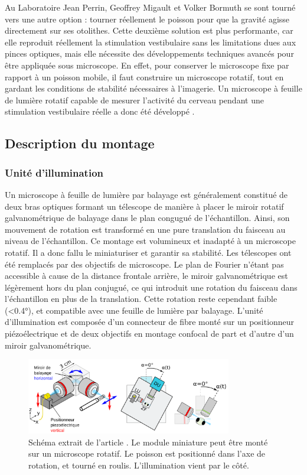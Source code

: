 Au Laboratoire Jean Perrin, Geoffrey Migault et Volker Bormuth se sont tourné vers une autre option : tourner réellement le poisson pour que la gravité agisse directement sur ses otolithes.
Cette deuxième solution est plus performante, car elle reproduit réellement la stimulation vestibulaire sans les limitations dues aux pinces optiques, mais elle nécessite des développements techniques avancés pour être appliquée sous microscope. En effet, pour conserver le microscope fixe par rapport à un poisson mobile, il faut construire un microscope rotatif, tout en gardant les conditions de stabilité nécessaires à l'imagerie. Un microscope à feuille de lumière rotatif capable de mesurer l'activité du cerveau pendant une stimulation vestibulaire réelle a donc été développé \cite{migault_whole-brain_2018}.

\subsection{Description du montage}

\subsubsection{Unité d'illumination}

Un microscope à feuille de lumière par balayage est généralement constitué de deux bras optiques formant un télescope de manière à placer le miroir rotatif galvanométrique de balayage dans le plan congugué de l'échantillon. Ainsi, son mouvement de rotation est transformé en une pure translation du faisceau au niveau de l'échantillon. Ce montage est volumineux et inadapté à un microscope rotatif. Il a donc fallu le miniaturiser et garantir sa stabilité. Les télescopes ont été remplacés par des objectifs de microscope. Le plan de Fourier n'étant pas accessible à cause de la distance frontale arrière, le miroir galvanométrique est légèrement hors du plan conjugué, ce qui introduit une rotation du faisceau dans l'échantillon en plus de la translation. Cette rotation reste cependant faible (<0.4°), et compatible avec une feuille de lumière par balayage.  
L'unité d'illumination est composée d'un connecteur de fibre monté sur un positionneur piézoélectrique et de deux objectifs en montage confocal de part et d'autre d'un miroir galvanométrique. 

\begin{figure}
\centering
\includegraphics[width=0.8\textwidth]{./files/miniature_light-sheet.svg.png}
\caption{Schéma extrait de l'article \cite{migault_whole-brain_2018}. Le module miniature peut être monté sur un microscope rotatif. Le poisson est positionné dans l'axe de rotation, et tourné en roulis. L'illumination vient par le côté.
}
\end{figure}

